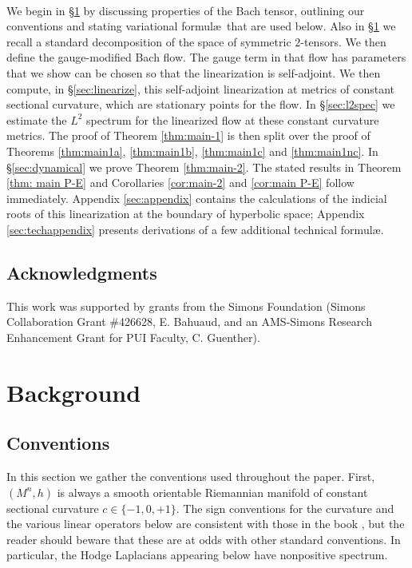 \documentclass[10pt,reqno]{amsart}
\begin{document}
\

We begin in \S \ref{sec:background} by discussing properties of the Bach tensor, outlining our conventions and stating variational formul\ae\
that are used below. Also in \S \ref{sec:background} we recall a standard decomposition of the space of symmetric $2$-tensors. 
We then define the gauge-modified Bach flow. The gauge term in that flow has parameters that we show can be chosen so that the linearization is self-adjoint. We then compute, in \S \ref{sec:linearize},
this self-adjoint linearization at metrics of constant sectional curvature, which are stationary points for the flow. In \S \ref{sec:l2spec} we estimate the $L^2$ spectrum for the linearized flow at these constant curvature metrics.  The proof of Theorem \ref{thm:main-1} is then split over the proof of Theorems \ref{thm:main1a}, \ref{thm:main1b}, \ref{thm:main1c} and \ref{thm:main1nc}.  In
\S \ref{sec:dynamical} we prove  Theorem \ref{thm:main-2}. The stated results in Theorem \ref{thm: main P-E} and Corollaries \ref{cor:main-2} and \ref{cor:main P-E} follow immediately. Appendix \ref{sec:appendix} contains
the calculations of the indicial roots of this linearization at the boundary of hyperbolic space; Appendix \ref{sec:techappendix} presents 
derivations of a few additional technical formul\ae.

\subsection{Acknowledgments}
This work was supported by  grants from the Simons Foundation (Simons Collaboration Grant \#426628, E. Bahuaud, and an AMS-Simons Research Enhancement Grant for PUI Faculty, C. Guenther).

\section{Background} \label{sec:background}

\subsection{Conventions} \label{sec:conventions}
In this section we gather the conventions used throughout the paper. First, $(M^n,h)$ is always a smooth orientable Riemannian manifold of constant sectional
curvature $c \in \{-1, 0, +1\}$.  The sign conventions for the curvature and the various linear operators below are consistent with those in the book \cite{CLN},
but the reader should beware that these are at odds with other standard conventions.  In particular, the Hodge Laplacians appearing below have nonpositive
spectrum. 
\end{document}
